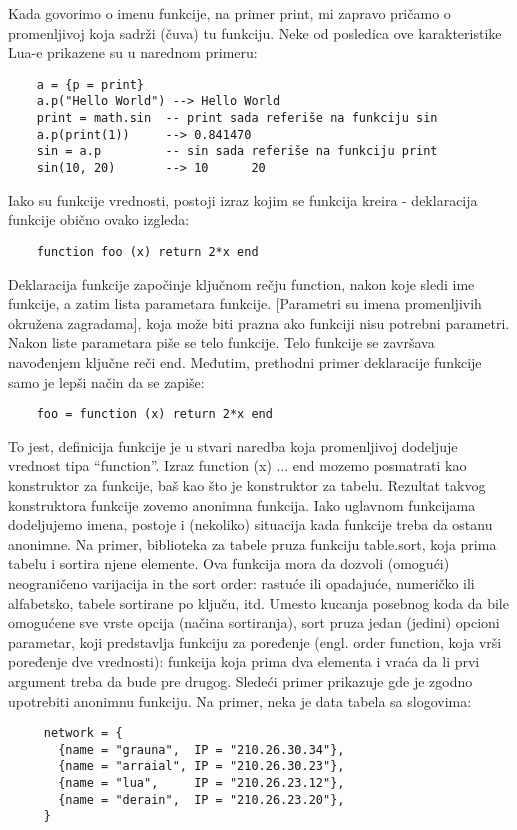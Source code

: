 \documentclass[a4paper]{article}
\begin{document}
Kada govorimo o imenu funkcije, na primer print, mi zapravo pričamo o promenljivoj koja sadrži (čuva) tu funkciju. Neke od posledica ove karakteristike Lua-e prikazene su u narednom primeru:

\begin{verbatim}
    a = {p = print}
    a.p("Hello World") --> Hello World
    print = math.sin  -- print sada referiše na funkciju sin
    a.p(print(1))     --> 0.841470
    sin = a.p         -- sin sada referiše na funkciju print
	sin(10, 20)       --> 10      20
\end{verbatim}
Iako su funkcije vrednosti, postoji izraz kojim se funkcija kreira - deklaracija funkcije obično ovako izgleda:
\begin{verbatim}
    function foo (x) return 2*x end
\end{verbatim}
Deklaracija funkcije započinje ključnom rečju function, nakon koje sledi ime funkcije, a zatim lista parametara funkcije. [Parametri su imena promenljivih okružena zagradama], koja može biti prazna ako funkciji nisu potrebni parametri. Nakon liste parametara piše se telo funkcije. Telo funkcije se završava navođenjem ključne reči end.
Međutim, prethodni primer deklaracije funkcije samo je lepši način da se zapiše:
\begin{verbatim}
    foo = function (x) return 2*x end
\end{verbatim}
To jest, definicija funkcije je u stvari naredba koja promenljivoj dodeljuje vrednost tipa “function”. Izraz function (x) ... end mozemo posmatrati kao konstruktor za funkcije, baš kao što je {} konstruktor za tabelu. Rezultat takvog konstruktora funkcije zovemo anonimna funkcija. Iako uglavnom funkcijama dodeljujemo imena, postoje i (nekoliko) situacija kada funkcije treba da ostanu anonimne. Na primer, biblioteka za tabele pruza funkciju table.sort, koja prima tabelu i sortira njene elemente. Ova funkcija mora da dozvoli (omogući) neograničeno varijacija in the sort order: rastuće ili opadajuće, numeričko ili alfabetsko, tabele sortirane po ključu, itd. Umesto kucanja posebnog koda da bile omogućene sve vrste opcija (načina sortiranja), sort pruza jedan (jedini) opcioni parametar, koji predstavlja funkciju za poređenje (engl. order function, koja vrši poređenje dve vrednosti): funkcija koja prima dva elementa i vraća da li prvi argument treba da bude pre drugog. Sledeći primer prikazuje gde je zgodno upotrebiti anonimnu funkciju. Na primer, neka je data tabela sa slogovima:
\begin{verbatim}
     network = {
       {name = "grauna",  IP = "210.26.30.34"},
       {name = "arraial", IP = "210.26.30.23"},
       {name = "lua",     IP = "210.26.23.12"},
       {name = "derain",  IP = "210.26.23.20"},
     }
\end{verbatim}
\end{document}
